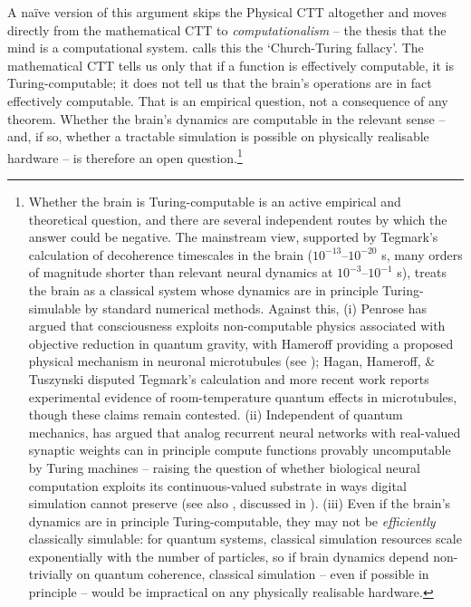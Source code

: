 \documentclass[11pt, a4paper, onecolumn, gdm]{google}
\begin{document}
A naïve version of this argument skips the Physical CTT altogether and moves directly from the mathematical CTT to \emph{computationalism} -- the thesis that the mind is a computational system.
\citet{piccinini2007} calls this the `Church-Turing fallacy'.
The mathematical CTT tells us only that if a function is effectively computable, it is Turing-computable; it does not tell us that the brain's operations are in fact effectively computable.
That is an empirical question, not a consequence of any theorem.
Whether the brain's dynamics are computable in the relevant sense -- and, if so, whether a tractable simulation is possible on physically realisable hardware -- is therefore an open question.\footnote{Whether the brain is Turing-computable is an active empirical and theoretical question, and there are several independent routes by which the answer could be negative. The mainstream view, supported by Tegmark's \citeyearpar{tegmark2000} calculation of decoherence timescales in the brain (\(10^{-13}\)--\(10^{-20}\) s, many orders of magnitude shorter than relevant neural dynamics at \(10^{-3}\)--\(10^{-1}\) s), treats the brain as a classical system whose dynamics are in principle Turing-simulable by standard numerical methods. Against this, (i) Penrose has argued that consciousness exploits non-computable physics associated with objective reduction in quantum gravity, with Hameroff providing a proposed physical mechanism in neuronal microtubules (see ); Hagan, Hameroff, \& Tuszynski \citeyearpar{hagan2002} disputed Tegmark's calculation and more recent work \citep[reviewed in][]{wiest2025} reports experimental evidence of room-temperature quantum effects in microtubules, though these claims remain contested. (ii) Independent of quantum mechanics, \citet{siegelmann1995,siegelmann2003} has argued that analog recurrent neural networks with real-valued synaptic weights can in principle compute functions provably uncomputable by Turing machines -- raising the question of whether biological neural computation exploits its continuous-valued substrate in ways digital simulation cannot preserve (see also \citealp{milinkovic2026}, discussed in ). (iii) Even if the brain's dynamics are in principle Turing-computable, they may not be \emph{efficiently} classically simulable: for quantum systems, classical simulation resources scale exponentially with the number of particles, so if brain dynamics depend non-trivially on quantum coherence, classical simulation -- even if possible in principle -- would be impractical on any physically realisable hardware.}
\end{document}
